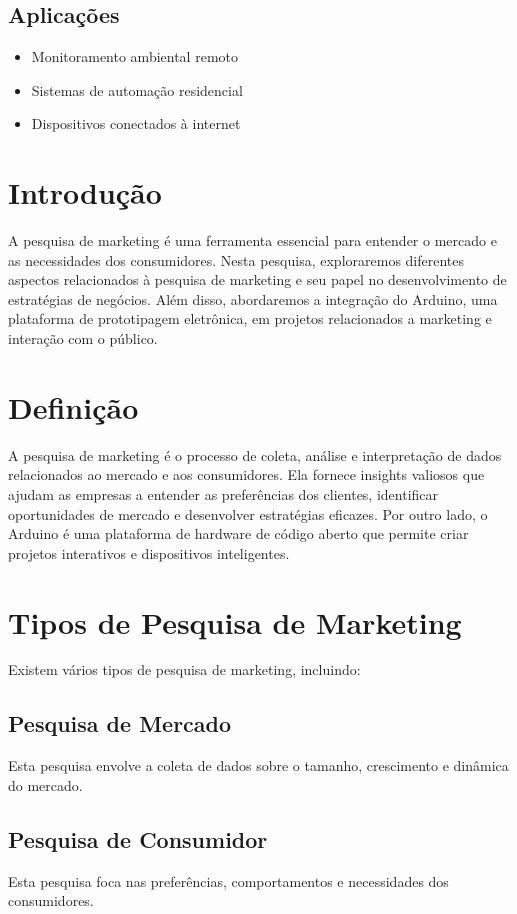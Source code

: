 \documentclass{ufersa}
\begin{document}
\subsection{Aplicações}
\begin{itemize}
    \item Monitoramento ambiental remoto
    \item Sistemas de automação residencial
    \item Dispositivos conectados à internet
\end{itemize}

\section{Introdução}
A pesquisa de marketing é uma ferramenta essencial para entender o mercado e as necessidades dos consumidores. Nesta pesquisa, exploraremos diferentes aspectos relacionados à pesquisa de marketing e seu papel no desenvolvimento de estratégias de negócios. Além disso, abordaremos a integração do Arduino, uma plataforma de prototipagem eletrônica, em projetos relacionados a marketing e interação com o público.

\section{Definição}
A pesquisa de marketing é o processo de coleta, análise e interpretação de dados relacionados ao mercado e aos consumidores. Ela fornece insights valiosos que ajudam as empresas a entender as preferências dos clientes, identificar oportunidades de mercado e desenvolver estratégias eficazes. Por outro lado, o Arduino é uma plataforma de hardware de código aberto que permite criar projetos interativos e dispositivos inteligentes.

\section{Tipos de Pesquisa de Marketing}
Existem vários tipos de pesquisa de marketing, incluindo:

\subsection{Pesquisa de Mercado}
Esta pesquisa envolve a coleta de dados sobre o tamanho, crescimento e dinâmica do mercado.

\subsection{Pesquisa de Consumidor}
Esta pesquisa foca nas preferências, comportamentos e necessidades dos consumidores.
\end{document}
